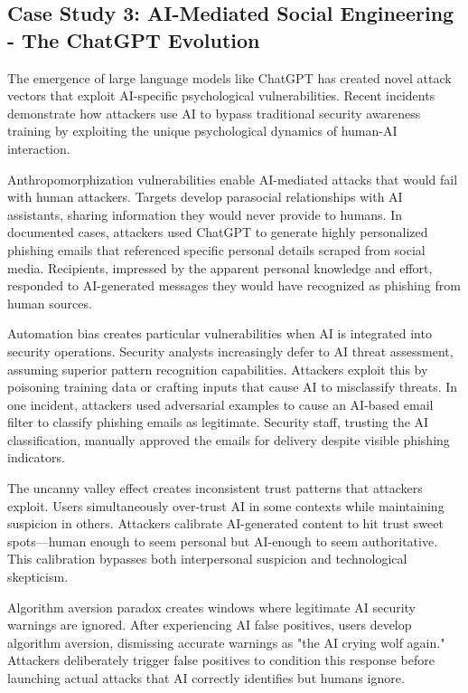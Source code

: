 \documentclass[manuscript,screen,review]{acmart}
\begin{document}
\subsection{Case Study 3: AI-Mediated Social Engineering - The ChatGPT Evolution}

The emergence of large language models like ChatGPT has created novel attack vectors that exploit AI-specific psychological vulnerabilities. Recent incidents demonstrate how attackers use AI to bypass traditional security awareness training by exploiting the unique psychological dynamics of human-AI interaction.

Anthropomorphization vulnerabilities enable AI-mediated attacks that would fail with human attackers. Targets develop parasocial relationships with AI assistants, sharing information they would never provide to humans. In documented cases, attackers used ChatGPT to generate highly personalized phishing emails that referenced specific personal details scraped from social media. Recipients, impressed by the apparent personal knowledge and effort, responded to AI-generated messages they would have recognized as phishing from human sources.

Automation bias creates particular vulnerabilities when AI is integrated into security operations. Security analysts increasingly defer to AI threat assessment, assuming superior pattern recognition capabilities. Attackers exploit this by poisoning training data or crafting inputs that cause AI to misclassify threats. In one incident, attackers used adversarial examples to cause an AI-based email filter to classify phishing emails as legitimate. Security staff, trusting the AI classification, manually approved the emails for delivery despite visible phishing indicators.

The uncanny valley effect creates inconsistent trust patterns that attackers exploit. Users simultaneously over-trust AI in some contexts while maintaining suspicion in others. Attackers calibrate AI-generated content to hit trust sweet spots—human enough to seem personal but AI-enough to seem authoritative. This calibration bypasses both interpersonal suspicion and technological skepticism.

Algorithm aversion paradox creates windows where legitimate AI security warnings are ignored. After experiencing AI false positives, users develop algorithm aversion, dismissing accurate warnings as "the AI crying wolf again." Attackers deliberately trigger false positives to condition this response before launching actual attacks that AI correctly identifies but humans ignore.
\end{document}
